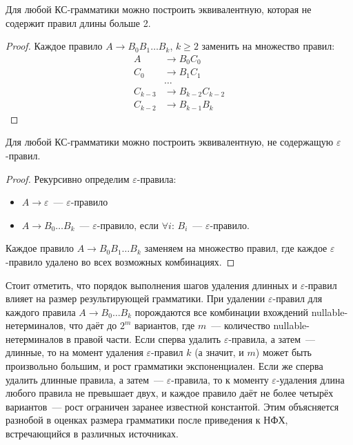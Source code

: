\begin{lemma}
    Для любой КС-грамматики можно построить эквивалентную, которая не содержит правил длины больше 2.
\end{lemma}

\begin{proof}
    Каждое правило $A \to B_0 B_1 \dots B_k$, $k \geq 2$ заменить на множество правил:
    \begin{align*}
        A       & \to B_0 C_0         \\
        C_0     & \to B_1 C_1         \\
                & \dots               \\
        C_{k-3} & \to B_{k-2} C_{k-2} \\
        C_{k-2} & \to B_{k-1} B_k
    \end{align*}
\end{proof}

\begin{lemma}
    Для любой КС-грамматики можно построить эквивалентную, не содержащую $\varepsilon$-правил.
\end{lemma}

\begin{proof}
    Рекурсивно определим $\varepsilon$-правила:
    \begin{itemize}
        \item $A \to \varepsilon$~--- $\varepsilon$-правило
        \item $A \to B_0 \dots B_k$~--- $\varepsilon$-правило, если $\forall i$: $B_i$~--- $\varepsilon$-правило.
    \end{itemize}
    Каждое правило $A \to B_0 B_1 \dots B_k$ заменяем на множество правил, где каждое $\varepsilon$-правило удалено во всех возможных комбинациях.
\end{proof}

Стоит отметить, что порядок выполнения шагов удаления длинных и $\varepsilon$-правил влияет на размер результирующей грамматики.
При удалении $\varepsilon$-правил для каждого правила $A \to B_0 \dots B_k$ порождаются все комбинации вхождений nullable-нетерминалов, что даёт до $2^m$ вариантов, где $m$~--- количество nullable-нетерминалов в правой части.
Если сперва удалить $\varepsilon$-правила, а затем~--- длинные, то на момент удаления $\varepsilon$-правил $k$ (а значит, и $m$) может быть произвольно большим, и рост грамматики экспоненциален.
Если же сперва удалить длинные правила, а затем~--- $\varepsilon$-правила, то к моменту $\varepsilon$-удаления длина любого правила не превышает двух, и каждое правило даёт не более четырёх вариантов~--- рост ограничен заранее известной константой.
Этим объясняется разнобой в оценках размера грамматики после приведения к НФХ, встречающийся в различных источниках.

